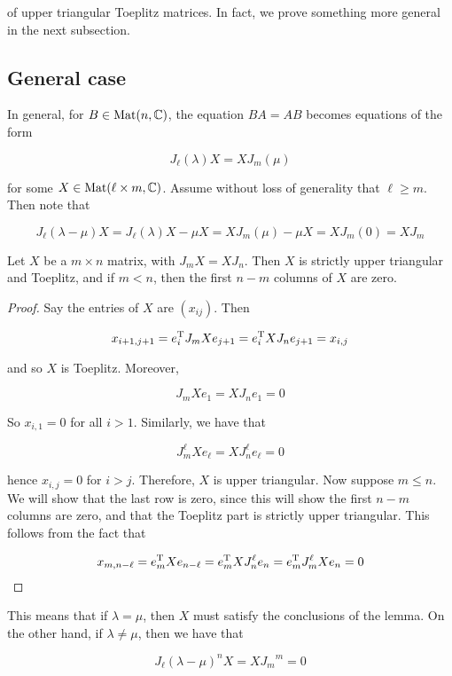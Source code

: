 \documentclass{article}
\begin{document}
of upper triangular Toeplitz matrices. In fact, we prove something more general in the next subsection.

\subsection{General case}

In general, for \(B \in \operatorname{Mat}(n, \mathbb{C})\), the equation \(BA = AB\) becomes equations of the form

\[J_\ell(\lambda)X = XJ_m(\mu)\]

for some \(X \in \operatorname{Mat}(\ell \times m, \mathbb{C})\). Assume without loss of generality that \(\ell \ge m\). Then note that

\[J_\ell(\lambda - \mu)X = J_\ell(\lambda)X - \mu X = XJ_m(\mu) - \mu X = XJ_m(0) = X J_m\]

\begin{lemma*}
    Let \(X\) be a \(m \times n\) matrix, with \(J_mX = XJ_n\). Then \(X\) is strictly upper triangular and Toeplitz, and if \(m < n\), then the first \(n - m\) columns of \(X\) are zero.
\end{lemma*}

\begin{proof}
    Say the entries of \(X\) are \((x_{ij})\). Then

    \[x_{i+1, j+1} = e_i^{\mathrm{T}} J_m Xe_{j+1} = e_i^{\mathrm{T}} X J_n e_{j+1} = x_{i, j}\]

    and so \(X\) is Toeplitz. Moreover,

    \[J_m X e_1 = X J_n e_1 = 0\]

    So \(x_{i, 1} = 0\) for all \(i > 1\). Similarly, we have that

    \[J_m^\ell X e_\ell = X J_n^\ell e_\ell = 0\]

    hence \(x_{i, j} = 0\) for \(i > j\). Therefore, \(X\) is upper triangular. Now suppose \(m \le n\). We will show that the last row is zero, since this will show the first \(n - m\) columns are zero, and that the Toeplitz part is strictly upper triangular. This follows from the fact that

    \[x_{m, n-\ell} = e_m^{\mathrm{T}} X e_{n-\ell} =  e_m^{\mathrm{T}} X J_n^\ell e_n = e_m^{\mathrm{T}} J_m^\ell X e_n = 0\]
\end{proof}

This means that if \(\lambda = \mu\), then \(X\) must satisfy the conclusions of the lemma. On the other hand, if \(\lambda \ne \mu\), then we have that

\[J_\ell(\lambda - \mu)^n X = X{J_m}^m = 0\]
\end{document}
